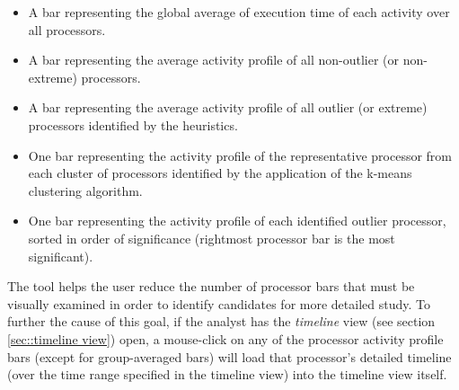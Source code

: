 \begin{itemize}
\item A bar representing the global average of execution time of each
activity over all processors.
\item A bar representing the average activity profile of all
non-outlier (or non-extreme) processors.
\item A bar representing the average activity profile of all outlier
(or extreme) processors identified by the heuristics.
\item One bar representing the activity profile of the representative
processor from each cluster of processors identified by the application
of the k-means clustering algorithm.
\item One bar representing the activity profile of each identified
outlier processor, sorted in order of significance (rightmost processor
bar is the most significant).
\end{itemize}

The tool helps the user reduce the number of processor bars that must
be visually examined in order to identify candidates for more detailed
study. To further the cause of this goal, if the analyst has the {\em
timeline} view (see section \ref{sec::timeline view}) open, a
mouse-click on any of the processor activity profile bars (except for
group-averaged bars) will load that processor's detailed timeline
(over the time range specified in the timeline view) into the timeline
view itself.



